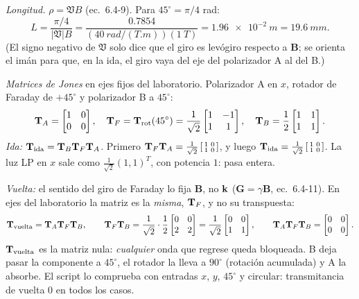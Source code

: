  \emph{Longitud.} $\rho=\mathfrak VB$ (ec.~6.4-9). Para $45^\circ=\pi/4$ rad:
\[
L=\frac{\pi/4}{|\mathfrak V|B}=\frac{0.7854}{(\SI{40}{rad/(T.m)})(\SI{1}{T})}=\SI{1.96e-2}{m}=\SI{19.6}{mm}.
\]
(El signo negativo de $\mathfrak V$ solo dice que el giro es levógiro respecto a $\mathbf B$; se orienta el imán
para que, en la ida, el giro vaya del eje del polarizador A al del B.)

\emph{Matrices de Jones} en ejes fijos del laboratorio. Polarizador A en $x$, rotador de Faraday de $+45^\circ$ y
polarizador B a $45^\circ$:
\[
\mathbf T_A=\begin{bmatrix}1&0\\0&0\end{bmatrix},\quad
\mathbf T_F=\mathbf T_{\rm rot}(45^\circ)=\frac{1}{\sqrt2}\begin{bmatrix}1&-1\\1&1\end{bmatrix},\quad
\mathbf T_B=\frac12\begin{bmatrix}1&1\\1&1\end{bmatrix}.
\]
\emph{Ida:} $\mathbf T_{\rm ida}=\mathbf T_B\mathbf T_F\mathbf T_A$. Primero $\mathbf T_F\mathbf T_A=\frac{1}{\sqrt2}\left[\begin{smallmatrix}1&0\\1&0\end{smallmatrix}\right]$, y luego
$\mathbf T_{\rm ida}=\frac{1}{\sqrt2}\left[\begin{smallmatrix}1&0\\1&0\end{smallmatrix}\right]$. La luz LP en $x$ sale como
$\frac{1}{\sqrt2}(1,1)^T$, con potencia $1$: pasa entera.

\emph{Vuelta:} el sentido del giro de Faraday lo fija $\mathbf B$, no $\mathbf k$ ($\mathbf G=\gamma\mathbf B$, ec.~6.4-11).
En ejes del laboratorio la matriz es la \emph{misma}, $\mathbf T_F$, y no su transpuesta:
\[
\mathbf T_{\rm vuelta}=\mathbf T_A\mathbf T_F\mathbf T_B,\qquad \mathbf T_F\mathbf T_B=\frac{1}{\sqrt2}\cdot\frac12\begin{bmatrix}0&0\\2&2\end{bmatrix}=\frac{1}{\sqrt2}\begin{bmatrix}0&0\\1&1\end{bmatrix},\qquad
\mathbf T_A\mathbf T_F\mathbf T_B=\begin{bmatrix}0&0\\0&0\end{bmatrix}.
\]
$\mathbf T_{\rm vuelta}$ es la matriz nula: \emph{cualquier} onda que regrese queda bloqueada. B deja pasar la componente a
$45^\circ$, el rotador la lleva a $90^\circ$ (rotación acumulada) y A la absorbe. El script lo comprueba con
entradas $x$, $y$, $45^\circ$ y circular: transmitancia de vuelta 0 en todos los casos.


